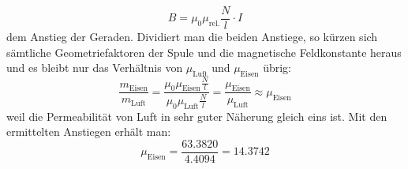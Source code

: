 \documentclass[german,  %
parskip=full,  %
]{scrartcl}
\begin{document}
\[B = \mu_0\mu_{\mathrm{rel.}}\frac{N}{l}\cdot I\]
dem Anstieg der Geraden. Dividiert man die beiden Anstiege, so kürzen sich sämtliche Geometriefaktoren der Spule und die magnetische Feldkonstante heraus und es bleibt nur das Verhältnis von \(\mu_{\mathrm{Luft}}\) und \(\mu_{\mathrm{Eisen}}\) übrig:
\[\frac{m_{\mathrm{Eisen}}}{m_{\mathrm{Luft}}} = \frac{\mu_0\mu_{\mathrm{Eisen}}\frac{N}{l}}{\mu_0\mu_{\mathrm{Luft}}\frac{N}{l}} = \frac{\mu_{\mathrm{Eisen}}}{\mu_{\mathrm{Luft}}} \approx \mu_{\mathrm{Eisen}}\]
weil die Permeabilität von Luft in sehr guter Näherung gleich eins ist. Mit den ermittelten Anstiegen erhält man:
\[\mu_{\mathrm{Eisen}} = \frac{63.3820}{4.4094} = 14.3742\]
%
\end{document}
